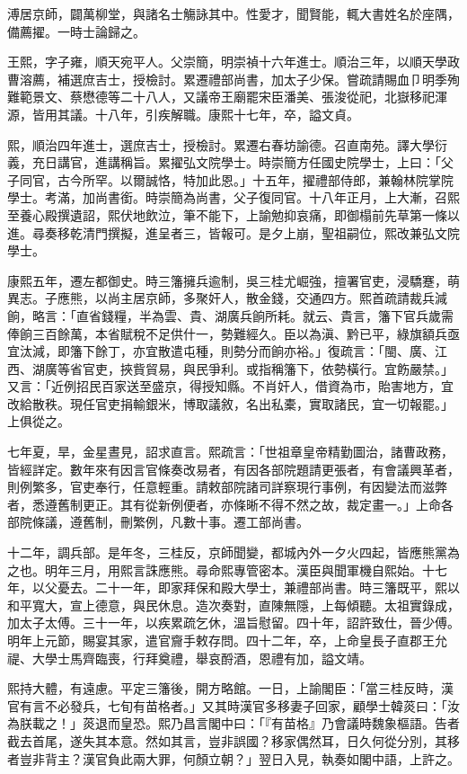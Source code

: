 \begin{pinyinscope}
溥居京師，闢萬柳堂，與諸名士觴詠其中。性愛才，聞賢能，輒大書姓名於座隅，備薦擢。一時士論歸之。

王熙，字子雍，順天宛平人。父崇簡，明崇禎十六年進士。順治三年，以順天學政曹溶薦，補選庶吉士，授檢討。累遷禮部尚書，加太子少保。嘗疏請賜血⼙明季殉難範景文、蔡懋德等二十八人，又議帝王廟罷宋臣潘美、張浚從祀，北嶽移祀渾源，皆用其議。十八年，引疾解職。康熙十七年，卒，謚文貞。

熙，順治四年進士，選庶吉士，授檢討。累遷右春坊諭德。召直南苑。譯大學衍義，充日講官，進講稱旨。累擢弘文院學士。時崇簡方任國史院學士，上曰：「父子同官，古今所罕。以爾誠恪，特加此恩。」十五年，擢禮部侍郎，兼翰林院掌院學士。考滿，加尚書銜。時崇簡為尚書，父子復同官。十八年正月，上大漸，召熙至養心殿撰遺詔，熙伏地飲泣，筆不能下，上諭勉抑哀痛，即御榻前先草第一條以進。尋奏移乾清門撰擬，進呈者三，皆報可。是夕上崩，聖祖嗣位，熙改兼弘文院學士。

康熙五年，遷左都御史。時三籓擁兵逾制，吳三桂尤崛強，擅署官吏，浸驕蹇，萌異志。子應熊，以尚主居京師，多聚奸人，散金錢，交通四方。熙首疏請裁兵減餉，略言：「直省錢糧，半為雲、貴、湖廣兵餉所耗。就云、貴言，籓下官兵歲需俸餉三百餘萬，本省賦稅不足供什一，勢難經久。臣以為滇、黔已平，綠旗額兵亟宜汰減，即籓下餘丁，亦宜散遣屯種，則勢分而餉亦裕。」復疏言：「閩、廣、江西、湖廣等省官吏，挾貲貿易，與民爭利。或指稱籓下，依勢橫行。宜飭嚴禁。」又言：「近例招民百家送至盛京，得授知縣。不肖奸人，借資為市，貽害地方，宜改給散秩。現任官吏捐輸銀米，博取議敘，名出私橐，實取諸民，宜一切報罷。」上俱從之。

七年夏，旱，金星晝見，詔求直言。熙疏言：「世祖章皇帝精勤圖治，諸曹政務，皆經詳定。數年來有因言官條奏改易者，有因各部院題請更張者，有會議興革者，則例繁多，官吏奉行，任意輕重。請敕部院諸司詳察現行事例，有因變法而滋弊者，悉遵舊制更正。其有從新例便者，亦條晰不得不然之故，裁定畫一。」上命各部院條議，遵舊制，刪繁例，凡數十事。遷工部尚書。

十二年，調兵部。是年冬，三桂反，京師聞變，都城內外一夕火四起，皆應熊黨為之也。明年三月，用熙言誅應熊。尋命熙專管密本。漢臣與聞軍機自熙始。十七年，以父憂去。二十一年，即家拜保和殿大學士，兼禮部尚書。時三籓既平，熙以和平寬大，宣上德意，與民休息。造次奏對，直陳無隱，上每傾聽。太祖實錄成，加太子太傅。三十一年，以疾累疏乞休，溫旨慰留。四十年，詔許致仕，晉少傅。明年上元節，賜宴其家，遣官齎手敕存問。四十二年，卒，上命皇長子直郡王允禔、大學士馬齊臨喪，行拜奠禮，舉哀酹酒，恩禮有加，謚文靖。

熙持大體，有遠慮。平定三籓後，開方略館。一日，上諭閣臣：「當三桂反時，漢官有言不必發兵，七旬有苗格者。」又其時漢官多移妻子回家，顧學士韓菼曰：「汝為朕載之！」菼退而皇恐。熙乃昌言閣中曰：「『有苗格』乃會議時魏象樞語。告者截去首尾，遂失其本意。然如其言，豈非誤國？移家偶然耳，日久何從分別，其移者豈非背主？漢官負此兩大罪，何顏立朝？」翌日入見，執奏如閣中語，上許之。


\end{pinyinscope}
